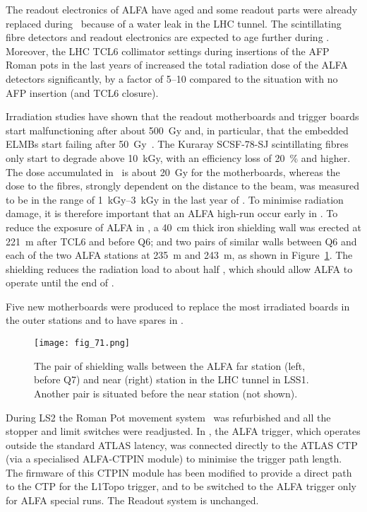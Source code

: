 \documentclass[cernpreprint, atlasdraft=false, UKenglish,british,orcidlogo, texmf, orcidlogo]{atlasdoc}
\begin{document}
The readout electronics of \gls{ALFA} have aged and some readout parts were already replaced during \RunTwo\ because of a water leak in the \gls{LHC} tunnel.
The scintillating fibre detectors and readout electronics are expected to age further during \RunThr. Moreover, the \gls{LHC} TCL6 collimator settings during insertions of the \gls{AFP} Roman pots in the last years of \RunTwo increased the total radiation dose of the \gls{ALFA} detectors significantly, by a factor of \numrange{5}{10} compared to the situation with no \gls{AFP} insertion (and TCL6 closure).
 
Irradiation studies have shown that the readout motherboards and trigger boards start malfunctioning after about \SI{500}{\gray} and, in particular, that the embedded \glspl{ELMB} start failing after \SI{50}{\gray}~\cite{Almeghari_2018}. The Kuraray SCSF-78-SJ scintillating fibres only start to degrade above \SI{10}{\kilo\gray}, with an efficiency loss of \SI{20}{\percent} and higher. The dose accumulated in \RunTwo\ is about \SI{20}{\gray} for the motherboards, whereas the dose to the fibres, strongly dependent on the distance to the beam, was measured to be in the range of \SIrange{1}{3}{\kilo\gray} in the last year of \RunTwo.
To minimise radiation damage, it is therefore important that an \gls{ALFA} high-\betastar run occur early in \RunThr. To reduce the exposure of \gls{ALFA} in \RunThr, a \SI{40}{\cm} thick iron shielding wall was erected at \SI{221}{\m} after TCL6 and before Q6; and two pairs of similar walls between Q6 and each of the two \gls{ALFA} stations at \SI{235}{\m} and \SI{243}{\m}, as shown in Figure~\ref{fig:AlfaShielding}. The shielding reduces the radiation load to about half
, which should allow \gls{ALFA} to operate until the end of \RunThr.
 
Five new motherboards were produced to replace the most irradiated boards in the outer stations and to have spares in \RunThr.
\begin{figure}[ht!]
\centering
\texttt{[image: fig\_71.png]}
\caption{The pair of shielding walls between the \gls{ALFA} far station (left, before Q7) and near (right) station in the \gls{LHC} tunnel in LSS1. Another pair is situated before the near station (not shown).}
\label{fig:AlfaShielding}
\end{figure}
 
During \gls{LS2} the Roman Pot movement system~\cite{ALFA-Detector} was refurbished and all the stopper and limit switches were readjusted. In \RunTwo, the \gls{ALFA} trigger, which operates outside the standard ATLAS latency, was connected directly to the ATLAS \gls{CTP} (via a specialised \gls{ALFA}-\gls{CTPIN} module) to minimise the trigger path length. The firmware of this \gls{CTPIN} module has been modified to provide a direct path to the \gls{CTP} for the \gls{L1Topo} trigger, and to be switched to the \gls{ALFA} trigger only for \gls{ALFA} special runs. The Readout system is unchanged.
 
\end{document}
